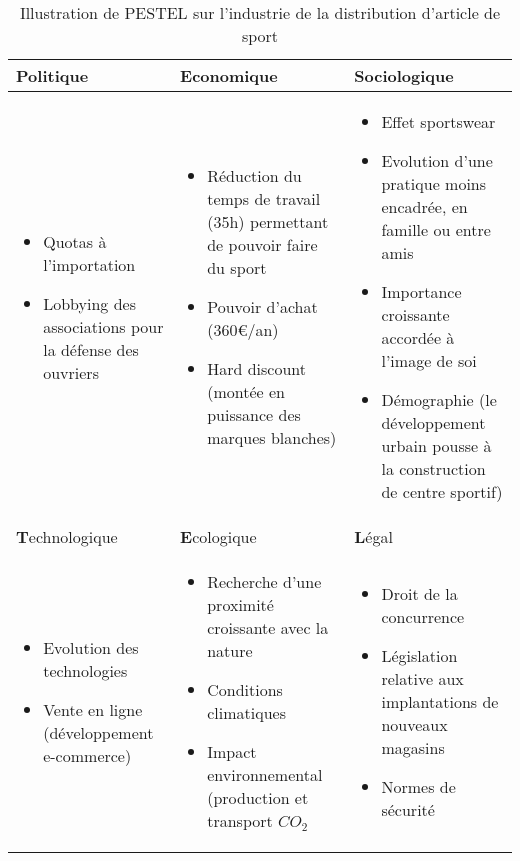         \begin{table}[!ht]
      \begin{center}
	\begin{tabular}{|>{\centering\arraybackslash}P{5cm}||>{\centering\arraybackslash}P{5cm}||>{\centering\arraybackslash}P{5cm}|}
	 \hline
	   \textbf{P}olitique &  \textbf{E}conomique & \textbf{S}ociologique \\ \hline
	  \begin{itemize} 
	  \item Quotas à l'importation 
	  \item Lobbying des associations pour la défense des ouvriers
	  \end{itemize}
	  & 
	  \begin{itemize} 
	  \item Réduction du temps de travail (35h) permettant de pouvoir faire du sport
	  \item Pouvoir d'achat (360\euro{}/an)
	  \item Hard discount (montée en puissance des marques blanches)
	  \end{itemize}
	  & 
	  \begin{itemize}
	  \item Effet sportswear
	  \item Evolution d'une pratique moins encadrée, en famille ou entre amis
	  \item Importance croissante accordée à l'image de soi
	  \item Démographie (le développement urbain pousse à la construction de centre sportif)
	  \end{itemize} \\  \hline
	   \textbf{T}echnologique &  \textbf{E}cologique & \textbf{L}égal \\ \hline
	  \begin{itemize}
	   \item Evolution des technologies
	   \item Vente en ligne (développement e-commerce)
	  \end{itemize}
	  &
	  \begin{itemize}
	   \item Recherche d'une proximité croissante avec la nature
	   \item Conditions climatiques
	   \item Impact environnemental (production et transport $CO_{2}$
	  \end{itemize}
	  &
	  \begin{itemize}
	   \item Droit de la concurrence
	   \item Législation relative aux implantations de nouveaux magasins
	   \item Normes de sécurité
	  \end{itemize} \\ \hline
	  
	\end{tabular}
	
	\caption{Illustration de PESTEL sur l'industrie de la distribution d'article de sport}
      \end{center}
    \end{table}
    
